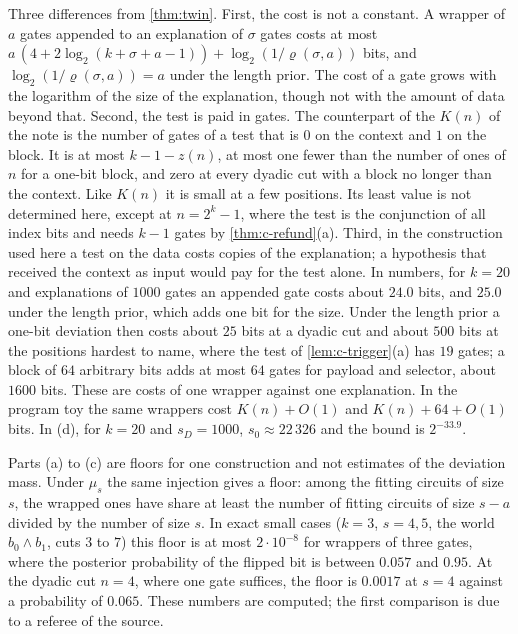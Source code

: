 Three differences from \cref{thm:twin}. First, the cost is not a constant. A wrapper of $a$ gates appended to
an explanation of $\sigma$ gates costs at most $a\,(4+2\log_2(k+\sigma+a-1))+\log_2(1/\varrho(\sigma,a))$
bits, and $\log_2(1/\varrho(\sigma,a))=a$ under the length prior. The cost of a gate grows with the logarithm
of the size of the explanation, though not with the amount of data beyond that. Second, the test is paid in
gates. The counterpart of the $K(n)$ of the note is the number of gates of a test that is $0$ on the context
and $1$ on the block. It is at most $k-1-z(n)$, at most one fewer than the number of ones of $n$ for a one-bit
block, and zero at every dyadic cut with a block no longer than the context. Like $K(n)$ it is small at a few
positions. Its least value is not determined here, except at $n=2^k-1$, where the test is the conjunction of
all index bits and needs $k-1$ gates by \cref{thm:c-refund}(a). Third, in the construction used here a test on
the data costs copies of the explanation; a hypothesis that received the context as input would pay for the
test alone. In numbers, for $k=20$ and explanations of $1000$ gates an appended gate costs about $24.0$ bits,
and $25.0$ under the length prior, which adds one bit for the size. Under the length prior a one-bit deviation
then costs about $25$ bits at a dyadic cut and about $500$ bits at the positions hardest to name, where the
test of \cref{lem:c-trigger}(a) has $19$ gates; a block of $64$ arbitrary bits adds at most $64$ gates for
payload and selector, about $1600$ bits. These are costs of one wrapper against one explanation. In the
program toy the same wrappers cost $K(n)+O(1)$ and $K(n)+64+O(1)$ bits. In (d), for $k=20$ and $s_D=1000$,
$s_0\approx22\,326$ and the bound is $2^{-33.9}$.

Parts (a) to (c) are floors for one construction and not estimates of the deviation mass. Under $\mu_s$ the
same injection gives a floor: among the fitting circuits of size $s$, the wrapped ones have share at least the
number of fitting circuits of size $s-a$ divided by the number of size $s$. In exact small cases ($k=3$,
$s=4,5$, the world $b_0\wedge b_1$, cuts $3$ to $7$) this floor is at most $2\cdot10^{-8}$ for wrappers of
three gates, where the posterior probability of the flipped bit is between $0.057$ and $0.95$. At the dyadic
cut $n=4$, where one gate suffices, the floor is $0.0017$ at $s=4$ against a probability of $0.065$. These
numbers are computed; the first comparison is due to a referee of the source.

